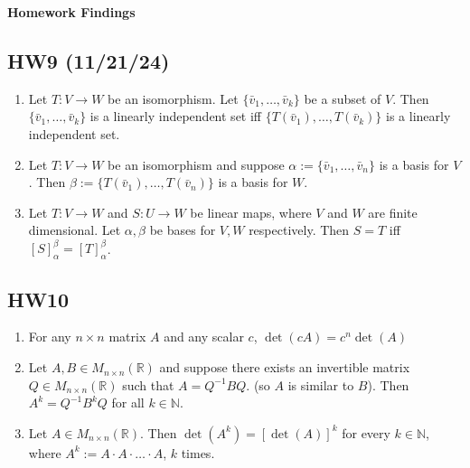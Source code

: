 \noindent
\textbf{\LARGE Homework Findings} \\

\normalsize

\subsection*{HW9 (11/21/24)}
\begin{enumerate}
    \item Let $T:V \rightarrow W$ be an isomorphism. Let $\{\bar v_1, \ldots , \bar v_k\}$ be a subset of $V$. Then $\{\bar v_1, \ldots , \bar v_k\}$ is a linearly independent set iff $\{T(\bar v_1), \ldots , T(\bar v_k)\}$ is a linearly independent set.
    \item Let $T: V \rightarrow W$ be an isomorphism and suppose $\alpha := \{\bar v_1, \ldots , \bar v_n\}$ is a basis for $V$. Then $\beta := \{T(\bar v_1), \ldots , T(\bar v_n)\}$ is a basis for $W$.
    \item Let $T: V \rightarrow W$ and $S: U \rightarrow W$ be linear maps, where $V$ and $W$ are finite dimensional. Let $\alpha, \beta$ be bases for $V,W$ respectively. Then $S=T$ iff $[S]_\alpha^\beta = [T]_\alpha^\beta$.
\end{enumerate}

\subsection*{HW10} 
\begin{enumerate}
    \item For any $n \times n$ matrix $A$ and any scalar $c$, $\det(cA)=c^n\det(A)$
    \item Let $A,B \in M_{n \times n}(\mathbb{R})$ and suppose there exists an invertible matrix $Q \in M_{n \times n}(\mathbb{R})$ such that $A=Q^{-1}BQ$. (so $A$ is similar to $B$). Then $A^k=Q^{-1}B^kQ$ for all $k \in \mathbb{N}$.
    \item Let $A \in M_{n \times n}(\mathbb{R})$. Then $\det(A^k)=[\det(A)]^k$ for every $k \in \mathbb{N}$, where $A^k := A \cdot A \cdot \ldots \cdot A$, $k$ times.
\end{enumerate}

